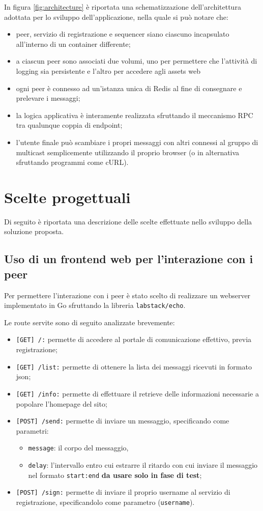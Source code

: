 \documentclass[conference]{IEEEtran}
\begin{document}
In figura \ref{fig:architecture} è riportata una schematizzazione dell'architettura adottata per lo sviluppo dell'applicazione, nella quale si può notare che:
\begin{itemize}
\item peer, servizio di registrazione e sequencer siano ciascuno incapsulato all'interno di un container differente;
\item a ciascun peer sono associati due volumi, uno per permettere che l'attività di logging sia persistente e l'altro per accedere agli assets web

\item ogni peer è connesso ad un'istanza unica di Redis al fine di consegnare e prelevare i messaggi;

\item la logica applicativa è interamente realizzata sfruttando il meccanismo RPC tra qualunque coppia di endpoint;

\item l'utente finale può scambiare i propri messaggi con altri connessi al gruppo di multicast semplicemente utilizzando il proprio browser (o in alternativa sfruttando programmi come cURL). 
\end{itemize}
\section{Scelte progettuali}
Di seguito è riportata una descrizione delle scelte effettuate nello sviluppo della soluzione proposta.

\subsection{Uso di un frontend web per l'interazione con i peer}
Per permettere l'interazione con i peer è stato scelto di realizzare un webserver implementato in Go sfruttando la libreria \texttt{labstack/echo}.

Le route servite sono di seguito analizzate brevemente:
\begin{itemize}
\item \texttt{[GET] /:} permette di accedere al portale di comunicazione effettivo, previa registrazione;
\item \texttt{[GET] /list:} permette di ottenere la lista dei messaggi ricevuti in formato json;
\item \texttt{[GET] /info:} permette di effettuare il retrieve delle informazioni necessarie a popolare l'homepage del sito;
\item \texttt{[POST] /send:} permette di inviare un messaggio, specificando come parametri:
\begin{itemize}
\item \texttt{message}: il corpo del messaggio,
\item \texttt{delay}: l'intervallo entro cui estrarre il ritardo con cui inviare il messaggio nel formato \texttt{start:end} \textbf{da usare solo in fase di test};
\end{itemize}
\item \texttt{[POST] /sign:} permette di inviare il proprio username al servizio di registrazione, specificandolo come parametro (\texttt{username}).
\end{itemize}
\end{document}
